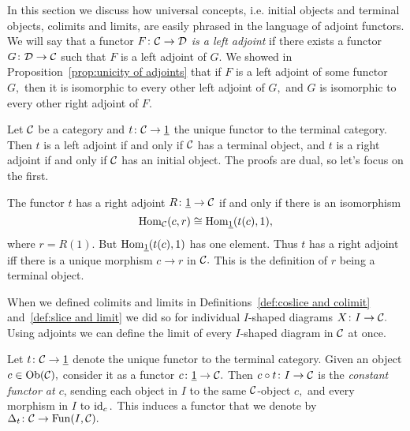 \documentclass[CT4S-EN-RU]{subfiles}
\begin{document}
\begin{blockENG}
In this section we discuss how universal concepts, i.e. initial objects and terminal objects, colimits and limits, are easily phrased in the language of adjoint functors. We will say that a functor $F\colon\mathcal{C}\rightarrow\mathcal{D}$ {\em is a left adjoint} if there exists a functor $G\colon\mathcal{D}\rightarrow\mathcal{C}$ such that $F$ is a left adjoint of $G.$ We showed in Proposition~\ref{prop:unicity of adjoints} that if $F$ is a left adjoint of some functor $G,$ then it is isomorphic to every other left adjoint of $G,$ and $G$ is isomorphic to every other right adjoint of $F.$
\end{blockENG}

\begin{blockRUS}
\end{blockRUS}

\begin{exampleENG}
Let $\mathcal{C}$ be a category and $t\colon\mathcal{C}\rightarrow\underline{1}$ the unique functor to the terminal category. Then $t$ is a left adjoint if and only if $\mathcal{C}$ has a terminal object, and $t$ is a right adjoint if and only if $\mathcal{C}$ has an initial object. The proofs are dual, so let's focus on the first.

The functor $t$ has a right adjoint $R\colon\underline{1}\rightarrow\mathcal{C}$ if and only if there is an isomorphism $$\operatorname{Hom}_\mathcal{C}(c,r)\cong\operatorname{Hom}_{\underline{1}}(t(c),1),$$ where $r=R(1).$ But $\operatorname{Hom}_{\underline{1}}(t(c),1)$ has one element. Thus $t$ has a right adjoint iff there is a unique morphism $c\to r$ in $\mathcal{C}.$ This is the definition of $r$ being a terminal object.
\end{exampleENG}

\begin{exampleRUS}
\end{exampleRUS}

\begin{blockENG}
When we defined colimits and limits in Definitions~\ref{def:coslice and colimit} and~\ref{def:slice and limit} we did so for individual $I$-shaped diagrams $X\colon I\rightarrow\mathcal{C}.$ Using adjoints we can define the limit of every $I$-shaped diagram in $\mathcal{C}$ at once.
\end{blockENG}

\begin{blockRUS}
\end{blockRUS}

\begin{blockENG}
Let $t\colon\mathcal{C}\rightarrow\underline{1}$ denote the unique functor to the terminal category. Given an object $c\in\operatorname{Ob}(\mathcal{C}),$ consider it as a functor $c\colon\underline{1}\rightarrow\mathcal{C}.$ Then $c\circ t\colon I\rightarrow\mathcal{C}$ is the {\em constant functor at $c$}, sending each object in $I$ to the same $\mathcal{C}$-object $c,$ and every morphism in $I$ to $\operatorname{id}_c.$ This induces a functor that we denote by $\Delta_t\colon\mathcal{C}\rightarrow\operatorname{Fun}(I,\mathcal{C}).$
\end{blockENG}
\end{document}
